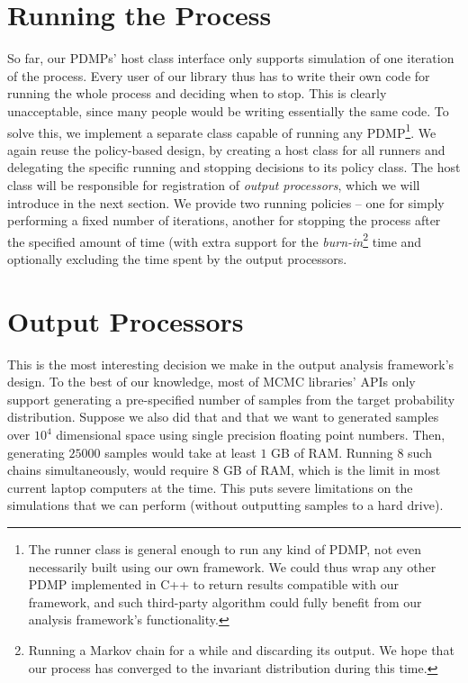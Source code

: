 \documentclass[report.tex]{subfiles}
\begin{document}
\section{Running the Process}

So far, our PDMPs' host class interface only supports simulation of one iteration
of the process.
Every user of our library thus has to write their own code for running the whole process
and deciding when to stop. This is clearly unacceptable, since many people would be
writing essentially the same code.
To solve this, we implement a separate class capable of running any PDMP\footnote{
  The runner class is general enough to run any kind of PDMP, not even necessarily built
  using our own framework. We could thus wrap any other PDMP implemented in C++ to return
  results compatible with our framework, and such third-party algorithm could fully benefit
  from our analysis framework's functionality.
}. We again reuse the policy-based design, by creating a host class for all runners
and delegating the specific running and stopping decisions to its policy class.
The host class will be responsible for registration of \textit{output processors}, which we will
introduce in the next section. We provide two running policies -- one for simply
performing a fixed number of iterations, another for stopping the process after
the specified amount of time (with extra support for the
\textit{burn-in}\footnote{Running a Markov chain
for a while and discarding its output. We hope that our process has converged to the invariant distribution
during this time.
} time and optionally excluding the time spent by the output processors.


\section{Output Processors}
\label{section-output-processors}

This is the most interesting decision we make in the output analysis framework's design.
To the best of our knowledge, most of MCMC libraries' APIs only support generating
a pre-specified number of samples from the target probability distribution.
Suppose we also did that and that we want to generated samples over $10^{4}$ dimensional space
using single precision floating point numbers.
Then, generating $25000$ samples would take at least $1$ GB of RAM. Running 8 such
chains simultaneously, would require $8$ GB of RAM, which is the limit in most
current laptop computers at the time. This puts severe limitations on the simulations that we can perform (without
outputting samples to a hard drive).
\end{document}
